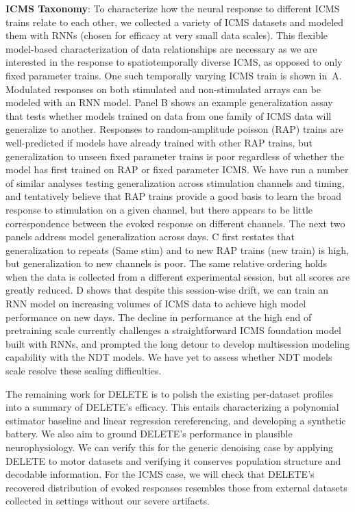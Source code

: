 \documentclass[12pt,oneside]{report}
\begin{document}
\textbf{ICMS Taxonomy}: To characterize how the neural response to different ICMS trains relate to each other, we collected a variety of ICMS datasets and modeled them with RNNs (chosen for efficacy at very small data scales). This flexible model-based characterization of data relationships are necessary as we are interested in the response to spatiotemporally diverse ICMS, as opposed to only fixed parameter trains. One such temporally varying ICMS train is shown in~A. Modulated responses on both stimulated and non-stimulated arrays can be modeled with an RNN model. Panel B shows an example generalization assay that tests whether models trained on data from one family of ICMS data will generalize to another. Responses to random-amplitude poisson (RAP) trains are well-predicted if models have already trained with other RAP trains, but generalization to unseen fixed parameter trains is poor regardless of whether the model has first trained on RAP or fixed parameter ICMS.
We have run a number of similar analyses testing generalization across stimulation channels and timing, and tentatively believe that RAP trains provide a good basis to learn the broad response to stimulation on a given channel, but there appears to be little correspondence between the evoked response on different channels. The next two panels address model generalization across days. C first restates that generalization to repeats (Same stim) and to new RAP trains (new train) is high, but generalization to new channels is poor. The same relative ordering holds when the data is collected from a different experimental session, but all scores are greatly reduced. D shows that despite this session-wise drift, we can train an RNN model on increasing volumes of ICMS data to achieve high model performance on new days. The decline in performance at the high end of pretraining scale currently challenges a straightforward ICMS foundation model built with RNNs, and prompted the long detour to develop multisession modeling capability with the NDT models. We have yet to assess whether NDT models scale resolve these scaling difficulties.

The remaining work for DELETE is to polish the existing per-dataset profiles into a summary of DELETE’s efficacy. This entails characterizing a polynomial estimator baseline and linear regression rereferencing, and developing a synthetic battery. We also aim to ground DELETE’s performance in plausible neurophysiology. We can verify this for the generic denoising case by applying DELETE to motor datasets and verifying it conserves population structure and decodable information. For the ICMS case, we will check that DELETE’s recovered distribution of evoked responses resembles those from external datasets collected in settings without our severe artifacts.
\end{document}
